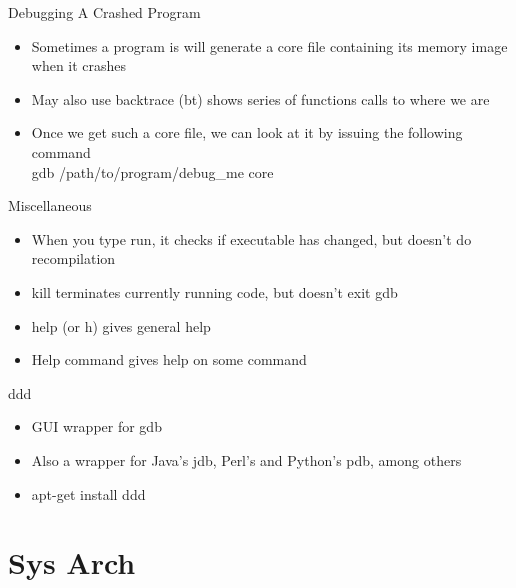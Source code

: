 \documentclass{beamer}
\begin{document}
\begin{frame}{Debugging A Crashed Program}
\begin{itemize}
\item Sometimes a program is will generate a core file containing its memory image when it crashes 
\item May also use backtrace (bt) shows series of functions calls to where we are
\item Once we get such a core file, we can look at it by issuing the following command \\
gdb /path/to/program/debug\_me core 
\end{itemize}
\end{frame}

\begin{frame}{Miscellaneous}
\begin{itemize}
\item When you type run, it checks if executable has changed, but doesn't do recompilation
\item kill terminates currently running code, but doesn't exit gdb
\item help (or h) gives general help
\item Help command gives help on some command
\end{itemize}
\end{frame}

\begin{frame}{ddd}
\begin{itemize}
\item GUI wrapper for gdb
\item Also a wrapper for Java's jdb, Perl's and Python's pdb, among others
\item apt-get install ddd
\end{itemize}
\end{frame}

\section{Sys Arch}
\subsection{}
\end{document}
